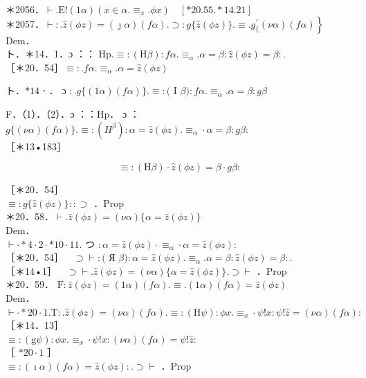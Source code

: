 \documentclass[10pt]{article}
\begin{document}
＊2056．$\vdash . \mathrm{E}!(1 \alpha)\left(x \in \alpha . \equiv_{x} . \phi x\right) \quad[* 20.55 . * 14.21]$\\
＊2057．$\left.\vdash: . \hat{z}(\phi z)=(\jmath \alpha)(f \alpha) . \supset: g\{\hat{z}(\phi z)\} . \equiv . g_{\{ }^{\prime}(\nu \alpha)(f \alpha)\right\}$\\
Dem．\\
ト．＊14．1．ɔ ：： $\mathrm{Hp} . \equiv:(\mathrm{H} \beta): f \alpha . \equiv_{\alpha} . \alpha=\beta: \hat{z}(\phi z)=\beta:$.\\
［＊20．54］$\equiv: . f \alpha . \equiv_{\alpha} . \alpha=\hat{z}(\phi z)$

ト．$* 14$ ⋅ ． ɔ $: . g\{(1 \alpha)(f \alpha)\} . \equiv:($ I $\beta): f \alpha . \equiv_{\alpha} . \alpha=\beta: g \beta$

F．（1）．（2）．ɔ ：：Hp． ɔ ：$g\{(\nu \alpha)(f \alpha)\} . \equiv:\left(H^{\beta}\right): \alpha=\hat{z}(\phi z) . \equiv_{\alpha} \cdot \alpha=\beta: g \beta:$\\
［＊13•183］


\begin{equation*}
\equiv:(\mathrm{H} \beta) \cdot \hat{z}(\phi z)=\beta \cdot g \beta: \tag{2}
\end{equation*}


［＊20．54］\\
$\equiv: g\{\hat{z}(\phi z)\}:: \supset$ ．Prop\\
＊20．58．$\vdash . \hat{z}(\phi z)=(\nu \alpha)\{\alpha=\hat{z}(\phi z)\}$\\
Dem．\\
$\vdash \cdot * 4 \cdot 2 \cdot * 10 \cdot 11$. つ $: \alpha=\hat{z}(\phi z) \cdot \equiv_{\alpha} \cdot \alpha=\hat{z}(\phi z):$\\
［＊20．54］$\quad \supset \vdash:($ Я $\beta): \alpha=\hat{z}(\phi z) . \equiv_{\alpha} . \alpha=\beta: \hat{z}(\phi z)=\beta:$.\\
［＊14•1］$\quad \supset \vdash . \hat{z}(\phi z)=(\nu \alpha)\{\alpha=\hat{z}(\phi z)\} . \supset \vdash$ ．Prop\\
＊20．59． $\mathrm{F}: \hat{z}(\phi z)=(1 \alpha)(f \alpha) . \equiv .(1 \alpha)(f \alpha)=\hat{z}(\phi z)$\\
Dem．\\
$\vdash \cdot * 20 \cdot 1 . \mathrm{T}: . \hat{z}(\phi z)=(\nu \alpha)(f \alpha) . \equiv:(\mathrm{H} \psi): \phi x . \equiv_{x} \cdot \psi!x: \psi!\hat{z}=(\nu \alpha)(f \alpha):$\\
［＊14．13］\\
$\equiv:(\mathrm{g} \psi): \phi x . \equiv_{x} \cdot \psi!x:(\nu \alpha)(f \alpha)=\psi!\hat{z}:$\\
［ $* 20 \cdot 1$ ］\\
$\equiv:(\imath \alpha)(f \alpha)=\widehat{z}(\phi z): . \supset \vdash$ ．Prop
\end{document}
